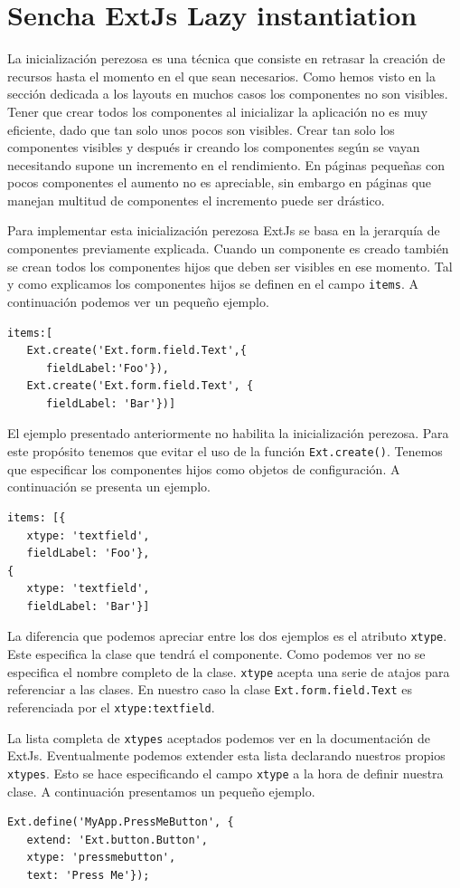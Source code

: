 \section{Sencha ExtJs Lazy instantiation}
	La inicialización perezosa es una técnica que consiste en retrasar la creación de recursos hasta el momento en el que sean necesarios. Como
	hemos visto en la sección dedicada a los layouts en muchos casos los componentes no son visibles. Tener que crear todos los componentes al
	inicializar la aplicación no es muy eficiente, dado que tan solo unos pocos son visibles. Crear tan solo los componentes visibles y después ir
	creando los componentes según se vayan necesitando supone un incremento en el rendimiento. En páginas pequeñas con pocos componentes el
	aumento no es apreciable, sin embargo en páginas que manejan multitud de componentes el incremento puede ser drástico. 
	\par
	Para implementar esta inicialización perezosa ExtJs se basa en la jerarquía de componentes previamente explicada. Cuando un componente es
	creado también se crean todos los componentes hijos que deben ser visibles en ese momento. Tal y como explicamos los componentes hijos se
	definen en el campo \texttt{items}. A continuación podemos ver un pequeño ejemplo. 
	\begin{lstlisting}
items:[
   Ext.create('Ext.form.field.Text',{
      fieldLabel:'Foo'}),
   Ext.create('Ext.form.field.Text', {
      fieldLabel: 'Bar'})]
	\end{lstlisting}
	El ejemplo presentado anteriormente no habilita la inicialización perezosa. Para este propósito tenemos que evitar el uso de la función
	\texttt{Ext.create()}. Tenemos que especificar los componentes hijos como objetos de configuración. A continuación se presenta un ejemplo.
	\begin{lstlisting}
items: [{
   xtype: 'textfield',
   fieldLabel: 'Foo'},
{
   xtype: 'textfield',
   fieldLabel: 'Bar'}]
	\end{lstlisting}
	La diferencia que podemos apreciar entre los dos ejemplos es el atributo \texttt{xtype}. Este especifica la clase que tendrá el componente.
	Como podemos ver no se especifica el nombre completo de la clase. \texttt{xtype} acepta una serie de atajos para referenciar a las clases. En
	nuestro caso la clase \texttt{Ext.form.field.Text} es referenciada por el \texttt{xtype:\cc textfield\cc}.
	\par
	La lista completa de \texttt{xtypes} aceptados podemos ver en la documentación de ExtJs\cite{ExtJsDoc}. Eventualmente podemos extender esta
	lista declarando nuestros propios \texttt{xtypes}. Esto se hace especificando el campo \texttt{xtype} a la hora de definir nuestra clase. A
	continuación presentamos un pequeño ejemplo.
	\begin{lstlisting}
Ext.define('MyApp.PressMeButton', {
   extend: 'Ext.button.Button',
   xtype: 'pressmebutton',
   text: 'Press Me'});
	\end{lstlisting}

